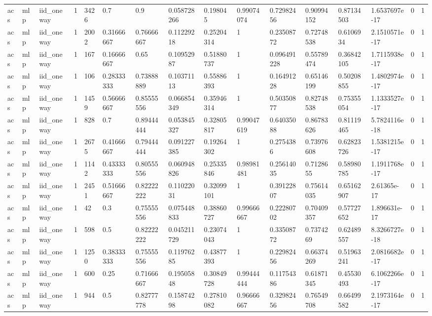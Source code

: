 \begin{tabular}{llllllllllllllll}
acs & mlp & iid\_oneway & 1 & 3426 & 0.7 & 0.9 & 0.058728266 & 0.198045 & 0.99074074 & 0.72982456 & 0.90994152 & 0.87134503 & 1.6537697e-17 & 0 & 1 \\
acs & mlp & iid\_oneway & 1 & 2002 & 0.31666667 & 0.76666667 & 0.11229218 & 0.25204314 & 1 & 0.23508772 & 0.72748538 & 0.6106934 & 2.1510571e-17 & 0 & 1 \\
acs & mlp & iid\_oneway & 1 & 167 & 0.16666667 & 0.65 & 0.10952987 & 0.51880737 & 1 & 0.096491228 & 0.55789474 & 0.36842105 & 1.7115938e-17 & 0 & 1 \\
acs & mlp & iid\_oneway & 1 & 106 & 0.28333333 & 0.73888889 & 0.10371113 & 0.55886393 & 1 & 0.16491228 & 0.65146199 & 0.50208855 & 1.4802974e-17 & 0 & 1 \\
acs & mlp & iid\_oneway & 1 & 1459 & 0.56666667 & 0.85555556 & 0.066854349 & 0.35946314 & 1 & 0.50350877 & 0.82748538 & 0.75355054 & 1.1333527e-17 & 0 & 1 \\
acs & mlp & iid\_oneway & 1 & 828 & 0.7 & 0.89444444 & 0.053845327 & 0.32805817 & 0.99047619 & 0.64035088 & 0.86783626 & 0.81119465 & 5.7824116e-18 & 0 & 1 \\
acs & mlp & iid\_oneway & 1 & 2675 & 0.41666667 & 0.79444444 & 0.091227385 & 0.19264302 & 1 & 0.2754386 & 0.73976608 & 0.62823726 & 1.5381215e-17 & 0 & 1 \\
acs & mlp & iid\_oneway & 1 & 1142 & 0.43333333 & 0.80555556 & 0.060948826 & 0.25335846 & 0.98981481 & 0.25614035 & 0.7128655 & 0.58980785 & 1.1911768e-17 & 0 & 1 \\
acs & mlp & iid\_oneway & 1 & 2451 & 0.51666667 & 0.82222222 & 0.11022031 & 0.32099101 & 1 & 0.39122807 & 0.75614035 & 0.65162907 & 2.61365e-17 & 0 & 1 \\
acs & mlp & iid\_oneway & 1 & 42 & 0.3 & 0.75555556 & 0.075448833 & 0.38860727 & 0.99666667 & 0.22280702 & 0.70409357 & 0.57727652 & 1.896631e-17 & 0 & 1 \\
acs & mlp & iid\_oneway & 1 & 598 & 0.5 & 0.82222222 & 0.045211729 & 0.23074043 & 1 & 0.33508772 & 0.7374269 & 0.62489557 & 8.3266727e-18 & 0 & 1 \\
acs & mlp & iid\_oneway & 1 & 1250 & 0.38333333 & 0.75555556 & 0.11976285 & 0.43877393 & 1 & 0.22982456 & 0.66374269 & 0.51963241 & 2.0816682e-17 & 0 & 1 \\
acs & mlp & iid\_oneway & 1 & 600 & 0.25 & 0.71666667 & 0.19505848 & 0.30849728 & 0.99444444 & 0.11754386 & 0.61871345 & 0.45530493 & 6.1062266e-17 & 0 & 1 \\
acs & mlp & iid\_oneway & 1 & 944 & 0.5 & 0.82777778 & 0.15874298 & 0.27810082 & 0.96666667 & 0.32982456 & 0.76549708 & 0.66499582 & 2.1973164e-17 & 0 & 1 \\

\end{tabular}
